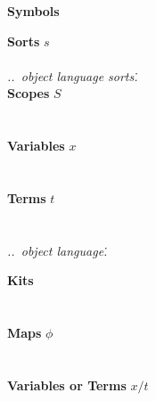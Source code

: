 \documentclass[screen,nonacm]{acmart}
\begin{document}
\begin{figure}[tp]
      \centering
      \small
      {\raggedright{} \textbf{\Large Symbols} \par}
      \vspace{1.5em}

      \begin{minipage}[t]{0.48\textwidth}
            \small{}
            \raggedright{}
            \textbf{Sorts} $s$ \\
            \ESortTy{}\\
            \vspace{0.5em}
            \emph{..\ object language sorts\..}\\
            \vspace{0.5em}
            \textbf{Scopes} $S$ \\
            \EScopeDefTy{}\\
            \vspace{0.5em}
            \EScopeDef{}\\
            \vspace{0.5em}
            \textbf{Variables} $x$ \\
            \EVarsTy{}\\
            \vspace{0.5em}
            \EVars{}\\
            \vspace{0.5em}
            \textbf{Terms} $t$ \\
            \ETmC{}\\
            \vspace{0.5em}
            \EVarC{}\\
            \emph{..\ object language\..}\\
            \vspace{1.0em}
      \end{minipage}
      \hfill
      \begin{minipage}[t]{0.48\textwidth}
            \small{}
            \raggedright{}
            \textbf{Kits}  \\
            \EKitDefTy{}\\
            \vspace{0.5em}
            \EKitDef{}\\
            \vspace{0.5em}
            \textbf{Maps} $ϕ$\\
            \EPrimsTy{}\\
            \vspace{0.5em}
            \EPrims{}\\
            \vspace{0.5em}
            \textbf{Variables or Terms} $x/t$\\
            \EVarTrmTy{}\\
            \vspace{0.5em}
            \EVarTrmApp{}
      \end{minipage}


\end{figure}
\end{document}
